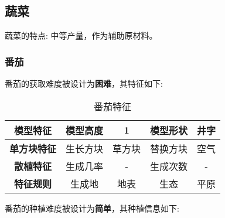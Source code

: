 \subsection{蔬菜}

蔬菜的特点: 中等产量，作为辅助原材料。

\subsubsection{番茄}

番茄的获取难度被设计为\textbf{困难}，其特征如下:
\begin{table}[H]
    \centering
    \caption{番茄特征}
    \label{table:番茄特征}
    \setlength{\tabcolsep}{4mm}
    \begin{tabular}{c|cc|cc}
        \toprule
        \textbf{模型特征}   & 模型高度 & 1      & 模型形状 & 井字 \\
        \midrule
        \textbf{单方块特征} & 生长方块 & 草方块 & 替换方块 & 空气 \\
        \midrule
        \textbf{散植特征}   & 生成几率 & -      & 生成次数 & -    \\
        \midrule
        \textbf{特征规则}   & 生成地   & 地表   & 生态     & 平原 \\
        \bottomrule
    \end{tabular}
\end{table}


番茄的种植难度被设计为\textbf{简单}，其种植信息如下:

